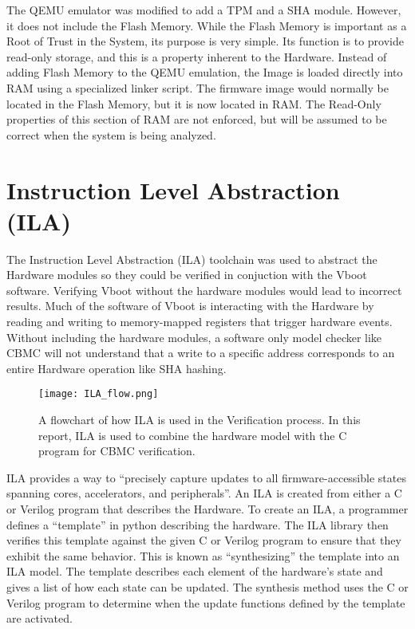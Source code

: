 The QEMU emulator was modified to add a TPM and a SHA module. 
However, it does not include the Flash Memory.
While the Flash Memory is important as a Root of Trust in the System, its purpose is very simple.
Its function is to provide read-only storage, and this is a property inherent to
the Hardware.
Instead of adding Flash Memory to the QEMU emulation, the Image is loaded
directly into RAM using a specialized linker script. %
The firmware image would normally be located in the Flash Memory, but it is now
located in RAM\@.
The Read-Only properties of this section of RAM are not enforced, but will be
assumed to be correct when the system is being analyzed.

\section{Instruction Level Abstraction (ILA)}

The Instruction Level Abstraction (ILA) toolchain was used to abstract the
Hardware modules so they could be verified in conjuction with the Vboot software.
Verifying Vboot without the hardware modules would lead to incorrect results. 
Much of the software of Vboot is interacting with the Hardware by reading and
writing to memory-mapped registers that trigger hardware events.
Without including the hardware modules, a software only model checker like CBMC
will not understand that a write to a specific address corresponds to an entire
Hardware operation like SHA hashing.

\begin{figure}
  \centering
  \texttt{[image: ILA\_flow.png]}
  \caption[ILA Verification Flowchart]{A flowchart of how ILA is used in the Verification process.
  In this report, ILA is used to combine the hardware model with the C program for CBMC verification.}
  \label{fig:ILA_flow}
\end{figure}

ILA provides a way to ``precisely capture updates to all firmware-accessible
states spanning cores, accelerators, and peripherals''\cite{ila-template}.
An ILA is created from either a C or Verilog program that describes the
Hardware.
To create an ILA, a programmer defines a ``template'' in python describing the
hardware.
The ILA library then verifies this template against the given C or Verilog
program to ensure that they exhibit the same behavior.
This is known as ``synthesizing'' the template into an ILA model.
The template describes each element of the hardware's state and gives a list of
how each state can be updated.
The synthesis method uses the C or Verilog program to determine when the update
functions defined by the template are activated.

